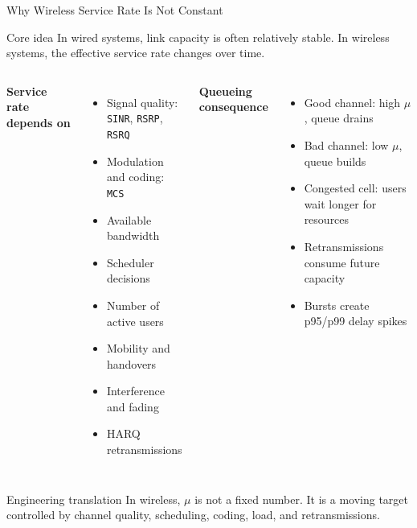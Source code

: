 \documentclass[aspectratio=169]{beamer}
\begin{document}
\begin{frame}{Why Wireless Service Rate Is Not Constant}
\tiny

\begin{block}{Core idea}
In wired systems, link capacity is often relatively stable. In wireless systems, the effective service rate changes over time.
\end{block}

\vspace{0.15cm}

\begin{columns}[T]

\textbf{Service rate depends on}

\begin{itemize}
    \item Signal quality: \texttt{SINR}, \texttt{RSRP}, \texttt{RSRQ}
    \item Modulation and coding: \texttt{MCS}
    \item Available bandwidth
    \item Scheduler decisions
    \item Number of active users
    \item Mobility and handovers
    \item Interference and fading
    \item HARQ retransmissions
\end{itemize}


\textbf{Queueing consequence}

\begin{itemize}
    \item Good channel: high $\mu$, queue drains
    \item Bad channel: low $\mu$, queue builds
    \item Congested cell: users wait longer for resources
    \item Retransmissions consume future capacity
    \item Bursts create p95/p99 delay spikes
\end{itemize}

\end{columns}

\vspace{0.15cm}

\begin{alertblock}{Engineering translation}
In wireless, $\mu$ is not a fixed number. It is a moving target controlled by channel quality, scheduling, coding, load, and retransmissions.
\end{alertblock}

\end{frame}
\end{document}
